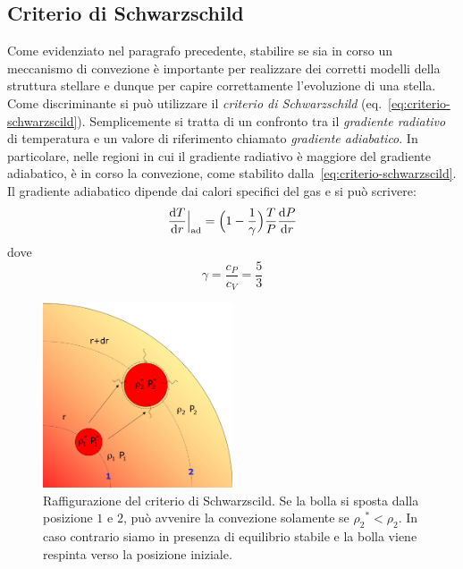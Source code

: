 \subsection{Criterio di Schwarzschild}
Come evidenziato nel paragrafo precedente, stabilire se sia in corso un meccanismo di convezione è importante per realizzare dei corretti modelli della struttura stellare e dunque per capire correttamente l'evoluzione di una stella. Come discriminante si può utilizzare il \emph{criterio di Schwarzschild} (eq.~\eqref{eq:criterio-schwarzscild}). Semplicemente si tratta di un confronto tra il \emph{gradiente radiativo} di temperatura e un valore di riferimento chiamato \emph{gradiente adiabatico}. In particolare, nelle regioni in cui il gradiente radiativo è maggiore del gradiente adiabatico, è in corso la convezione, come stabilito dalla~\eqref{eq:criterio-schwarzscild}. Il gradiente adiabatico dipende dai calori specifici del gas e si può scrivere:
\begin{equation}\label{eq:gradiente-adiabatico}
    \dfrac{\mathop{}\!\mathrm{d} T}{\mathop{}\!\mathrm{d} r}\Big|_\textup{ad} = \Bigl(1- \frac{1}{\gamma}\Bigr) \dfrac{T}{P} \dfrac{\mathop{}\!\mathrm{d} P}{\mathop{}\!\mathrm{d} r}
\end{equation}
dove
\[
\gamma =\frac{c_P}{c_V} = \frac{5}{3}
\]

\begin{figure}
\centering
\includegraphics[width=0.5\textwidth]{immagini/criterio-schwarzscild.png}
\caption{Raffigurazione del criterio di Schwarzscild. Se la bolla si sposta dalla posizione $1$ e $2$, può avvenire la convezione solamente se ${\rho_2}^* < \rho_2$. In caso contrario siamo in presenza di equilibrio stabile e la bolla viene respinta verso la posizione iniziale.}
\label{fig:criterio-schwarzscild}
\end{figure}

